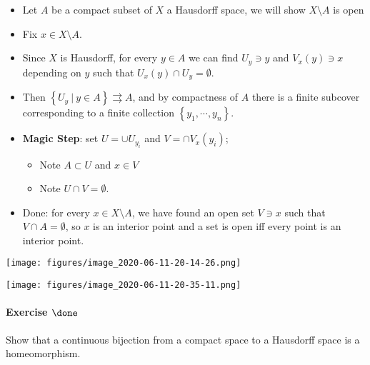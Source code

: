 \begin{solution}

\envlist

\begin{itemize}
\tightlist
\item
  Let \(A\) be a compact subset of \(X\) a Hausdorff space, we will show
  \(X\setminus A\) is open
\item
  Fix \(x\in X\setminus A\).
\item
  Since \(X\) is Hausdorff, for every \(y\in A\) we can find
  \(U_y \ni y\) and \(V_x(y) \ni x\) depending on \(y\) such that
  \(U_x(y) \cap U_y = \emptyset\).
\item
  Then
  \(\left\{{U_y {~\mathrel{\Big|}~}y\in A}\right\} \rightrightarrows A\),
  and by compactness of \(A\) there is a finite subcover corresponding
  to a finite collection \(\left\{{y_1, \cdots, y_n}\right\}\).
\item
  \textbf{Magic Step}: set \(U = \cup U_{y_i}\) and
  \(V = \cap V_x(y_i)\);

  \begin{itemize}
  \tightlist
  \item
    Note \(A\subset U\) and \(x\in V\)
  \item
    Note \(U\cap V = \emptyset\).
  \end{itemize}
\item
  Done: for every \(x\in X\setminus A\), we have found an open set
  \(V\ni x\) such that \(V\cap A = \emptyset\), so \(x\) is an interior
  point and a set is open iff every point is an interior point.
\end{itemize}

\texttt{[image: figures/image\_2020-06-11-20-14-26.png]}

\texttt{[image: figures/image\_2020-06-11-20-35-11.png]}

\end{solution}

\hypertarget{exercise-done-3}{%
\paragraph{\texorpdfstring{Exercise
\(\done\)}{Exercise \textbackslash done}}\label{exercise-done-3}}

Show that a continuous bijection from a compact space to a Hausdorff
space is a homeomorphism.

